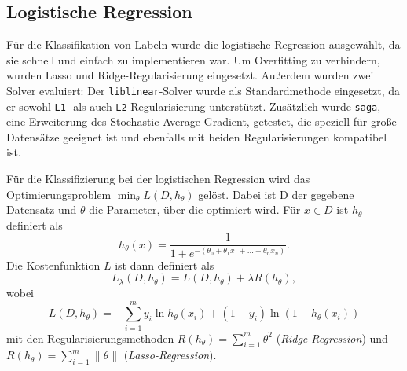 \subsection{Logistische Regression}
\label{sec:logreg}

Für die Klassifikation von Labeln wurde die logistische Regression ausgewählt, da sie schnell und einfach zu implementieren war. Um Overfitting zu verhindern, wurden Lasso und Ridge-Regularisierung eingesetzt. Außerdem wurden zwei Solver evaluiert: Der \texttt{liblinear}-Solver wurde als Standardmethode eingesetzt, da er sowohl \texttt{L1}- als auch \texttt{L2}-Regularisierung unterstützt. Zusätzlich wurde \texttt{saga}, eine Erweiterung des Stochastic Average Gradient, getestet, die speziell für große Datensätze geeignet ist und ebenfalls mit beiden Regularisierungen kompatibel ist.

Für die Klassifizierung bei der logistischen Regression wird das Optimierungsproblem $\min_\theta L(D,h_\theta)$ gelöst. Dabei ist D der gegebene Datensatz und $\theta$ die Parameter, über die optimiert wird. Für $x \in D$ ist $h_\theta$ definiert als
\begin{equation*}
    h_\theta(x) = \frac{1}{1 + e^{-(\theta_0 + \theta_1 x_1 + \dots + \theta_n x_n)}}.
\end{equation*}
Die Kostenfunktion $L$ ist dann definiert als
\begin{equation*}
    L_\lambda(D, h_\theta)=L(D,h_\theta)+\lambda R(h_\theta),
\end{equation*}
wobei
\begin{equation*}
    L(D,h_\theta)=- \sum_{i=1}^{m}  y_i \ln h_\theta(x_i) + (1 - y_i) \ln (1 - h_\theta(x_i))
\end{equation*}
mit den Regularisierungsmethoden $R(h_\theta)=\sum_{i=1}^m\theta^2$ (\textit{Ridge-Regression}) und $ R(h_\theta)=\sum_{i=1}^m\|\theta\|$ (\textit{Lasso-Regression}).
